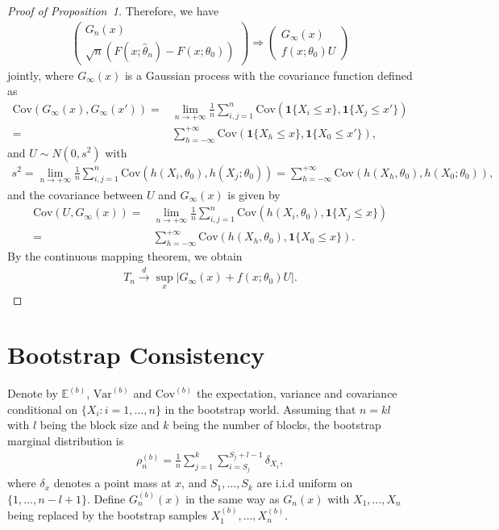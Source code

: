 \documentclass[12pt]{article}
\begin{document}
\begin{proof}[Proof of Proposition~1]
Therefore, we have
\begin{align*}
\begin{pmatrix}
G_n(x)  \\ 
\sqrt{n}(F(x;\hat{\theta}_n)-F(x;\theta_0))
\end{pmatrix}\Rightarrow
\begin{pmatrix}
G_{\infty}(x) \\
f(x;\theta_0)U
\end{pmatrix}
\end{align*}
jointly, where $G_{\infty}(x)$ is a Gaussian process with the covariance 
function defined as
\begin{align*}
\text{Cov}(G_{\infty}(x),G_{\infty}(x'))=& 
\lim_{n\rightarrow+\infty}\frac{1}{n}\sum^{n}_{i,j=1}
\text{Cov}(\mathbf{1}\{X_i\leq x\},\mathbf{1}\{X_j\leq x'\})
\\=& \sum^{+\infty}_{h=-\infty}\text{Cov}(\mathbf{1}\{X_{h}\leq x\},
\mathbf{1}\{X_0\leq x'\}),
\end{align*}
and $U\sim N(0,s^2)$ with 
\begin{align*}
s^2=\lim_{n\rightarrow+\infty}\frac{1}{n}\sum^{n}_{i,j=1}\text{Cov}(h(X_i,
\theta_0),h(X_j;\theta_0))
= \sum^{+\infty}_{h=-\infty}\text{Cov}(h(X_{h},\theta_0),h(X_0;\theta_0)),
\end{align*}
and the covariance between $U$ and $G_{\infty}(x)$ is given by
\begin{align*}
\text{Cov}(U,G_\infty(x))=&\lim_{n\rightarrow+\infty}
\frac{1}{n}\sum^{n}_{i,j=1}\text{Cov}(h(X_i,\theta_0),\mathbf{1}\{X_j\leq x\})
\\=&\sum^{+\infty}_{h=-\infty}
\text{Cov}(h(X_{h},\theta_0),\mathbf{1}\{X_0\leq x\}).
\end{align*}
By the continuous mapping theorem, we obtain
\begin{align*}
T_n \overset{d}{\rightarrow} \sup_x |G_{\infty}(x)+f(x;\theta_0)U|.    
\end{align*}

\end{proof}

\section{Bootstrap Consistency}

Denote by $\mathbb{E}^{(b)}$, $\text{Var}^{(b)}$ and $\text{Cov}^{(b)}$
the expectation, variance and covariance conditional on 
$\{X_i: i = 1, \ldots, n\}$ in 
the bootstrap world. Assuming that $n=kl$ with $l$ being the block size and $k$ 
being the number of blocks, the bootstrap marginal distribution is 
\begin{align*}
\rho_n^{(b)}=\frac{1}{n}\sum^{k}_{j=1}\sum^{S_j+l-1}_{i=S_j} \delta_{X_i},    
\end{align*}
where $\delta_x$ denotes a point mass at $x$, and $S_1,\dots,S_k$ are i.i.d 
uniform on $\{1,\dots,n-l+1\}$. 
Define $G_n^{(b)}(x)$ in the same way as $G_n(x)$ with $X_1, \dots, X_n$ being 
replaced by the bootstrap samples %
$X_1^{(b)},\dots,X_n^{(b)}.$
\end{document}

